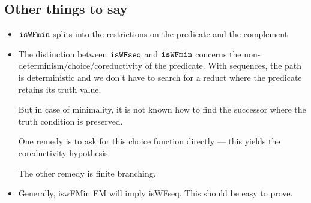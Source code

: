 \subsection{Other things to say}
\begin{itemize}
  \item $\mathtt{isWFmin}$ splits into the restrictions on the predicate and the complement
  \item The distinction between $\mathtt{isWFseq}$ and $\mathtt{isWFmin}$ concerns
  the non-determinism/choice/coreductivity of the predicate.
  With sequences, the path is deterministic and we don't have to
  search for a reduct where the predicate retains its truth value.

  But in case of minimality, it is not known how to find the successor
  where the truth condition is preserved.

  One remedy is to ask for this choice function directly --- this yields
  the coreductivity hypothesis.

  The other remedy is finite branching.

  \item Generally, iswFMin EM will imply isWFseq.  This should be easy to prove.





















\end{itemize}
